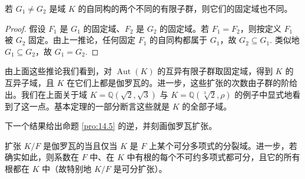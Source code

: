 \begin{corollary}\label{cor:14.12}
若 \(G_1 \neq G_2\) 是域 \(K\) 的自同构的两个不同的有限子群，则它们的固定域也不同。
\end{corollary}

\begin{proof}
假设 \(F_1\) 是 \(G_1\) 的固定域、\(F_2\) 是 \(G_2\) 的固定域。若 \(F_1 = F_2\)，则按定义 \(F_1\) 被 \(G_2\) 固定。由上一推论，任何固定 \(F_1\) 的自同构都属于 \(G_1\)，故 \(G_2 \subseteq G_1\). 类似地 \(G_1 \subseteq G_2\)，故 \(G_1 = G_2\).
\end{proof}

由上面这些推论我们看到，对 \(\operatorname{Aut}(K)\) 的互异有限子群取固定域，得到 \(K\) 的互异子域，且 \(K\) 在它们上都是伽罗瓦的。进一步，这些扩张的次数由子群的阶给出。我们在上面关于域 \(K = \mathbb{Q}(\sqrt{2}, \sqrt{3})\) 与 \(K = \mathbb{Q}(\sqrt[3]{2}, \rho)\) 的例子中显式地看到了这一点。基本定理的一部分断言这些就是 \(K\) 的全部子域。

下一个结果给出命题 \ref{pro:14.5} 的逆，并刻画伽罗瓦扩张。

\begin{theorem}\label{thm:14.13}
扩张 \(K/F\) 是伽罗瓦的当且仅当 \(K\) 是 \(F\) 上某个可分多项式的分裂域。进一步，若确实如此，则系数在 \(F\) 中、在 \(K\) 中有根的每个不可约多项式都可分，且它的所有根都在 \(K\) 中（故特别地 \(K/F\) 是可分扩张）。
\end{theorem}

